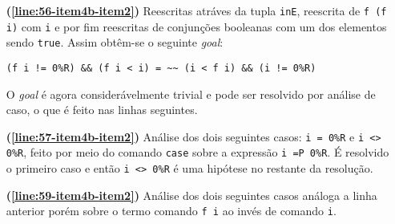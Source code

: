 \begin{enumerate}[label=\textbf{\roman*.}]
\begin{enumerate}[label=\textbf{\roman{enumi}.(\alph*)}]
\begin{enumerate}[label=\textbf{(\alph{enumii}.\arabic*)}]
\begin{enumerate}[listparindent=\parindent]
\begin{itemize}
                                                \item[\textbf{(\ref{line:56-item4b-item2})}] Reescritas atráves da tupla \lstinline[language=coq]|inE|, reescrita de \lstinline[language=coq]!f (f i)! com \lstinline[language=coq]!i! e por fim reescritas de conjunções booleanas com um dos elementos sendo \lstinline[language=coq]!true!. Assim obtêm-se o seguinte \textit{goal}:
                                                        \begin{lstlisting}[language=coq,frame=single,tabsize=1]
(f i != 0%R) && (f i < i) = ~~ (i < f i) && (i != 0%R)
                                                        \end{lstlisting}
                                                O \textit{goal} é agora considerávelmente trivial e pode ser resolvido por análise de caso, o que é feito nas linhas seguintes.

                                                \item[\textbf{(\ref{line:57-item4b-item2})}] Análise dos dois seguintes casos: \lstinline[language=coq]|i = 0%R| e \lstinline[language=coq]|i <> 0%R|, feito por meio do comando \lstinline[language=coq]|case| sobre a expressão \lstinline[language=coq]|i =P 0%R|. É resolvido o primeiro caso e então \lstinline[language=coq]|i <> 0%R| é uma hipótese no restante da resolução.
                                                
                                                \item[\textbf{(\ref{line:59-item4b-item2})}] Análise dos dois seguintes casos análoga a linha anterior porém sobre o termo comando \lstinline[language=coq]|f i| ao invés de comando \lstinline[language=coq]|i|.
                                                

\end{itemize}
\end{enumerate}
\end{enumerate}
\end{enumerate}
\end{enumerate}
